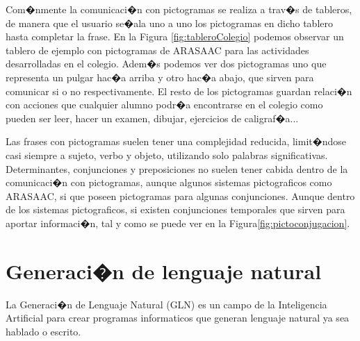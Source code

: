 \label{cap2:sec:Comunicacionatravesdepictogramas}




Com�nmente la comunicaci�n con pictogramas se realiza a trav�s de tableros, de manera que el usuario se�ala uno a uno los pictogramas en dicho tablero hasta completar la frase. En la Figura \ref{fig:tableroColegio} podemos observar un tablero de ejemplo con pictogramas de ARASAAC para las actividades desarrolladas en el colegio. Adem�s podemos ver dos pictogramas uno que representa un pulgar hac�a arriba y otro hac�a abajo, que sirven para comunicar si o no respectivamente. El resto de los pictogramas guardan relaci�n con acciones que cualquier alumno podr�a encontrarse en el colegio como pueden ser leer, hacer un examen, dibujar, ejercicios de caligraf�a... 

Las frases con pictogramas suelen tener una complejidad reducida, limit�ndose casi siempre a sujeto, verbo y objeto, utilizando solo palabras significativas.
 Determinantes, conjunciones y preposiciones no suelen tener cabida dentro de la comunicaci�n con pictogramas, aunque algunos sistemas pictograficos como ARASAAC, si que poseen pictogramas para algunas conjunciones. Aunque dentro de los sistemas pictograficos, si existen conjunciones temporales que sirven para aportar informaci�n, tal y como se puede ver en la Figura\ref{fig:pictoconjugacion}.


\section{Generaci�n de lenguaje natural}
\label{cap2:sec:Generaci�nDeLenguajeNatural}

La Generaci�n de Lenguaje Natural (GLN) es un campo de la Inteligencia Artificial para crear programas informaticos que generan lenguaje natural ya sea hablado o escrito\citep{Socorro2007}. 

